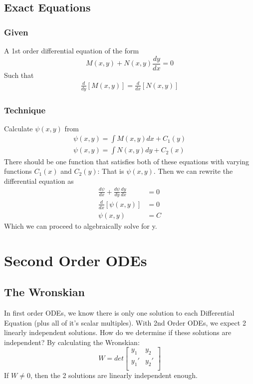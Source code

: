 \documentclass[11pt]{article}
\begin{document}
\subsection{Exact Equations}
\subsubsection{Given}
A 1st order differential equation of the form
    \[ M(x,y) + N(x,y)\frac{dy}{dx} = 0 \]
Such that
\begin{align*}
    \frac{d}{dy}[M(x,y)] = \frac{d}{dx}[ N(x,y)]
\end{align*}
\subsubsection{Technique}
Calculate $\psi (x,y)$ from
\begin{align*}
    \psi (x,y) = \int M(x,y)dx + C_1(y) \\
    \psi (x,y) = \int N(x,y)dy + C_2(x) 
\end{align*}
There should be one function that satisfies both of these equations with varying functions $C_1(x)$ and 
$C_2(y)$: That is $\psi (x,y)$. Then we can rewrite the differential equation as
\begin{align*}
\frac{d\psi}{dx} + \frac{d\psi}{dy}\frac{dy}{dx} &= 0 \\
\frac{d}{dx}[\psi (x,y)] &= 0\\
\psi (x,y) &= C
\end{align*}
Which we can proceed to algebraically solve for y.

\section{Second Order ODEs}
\subsection{The Wronskian}
In first order ODEs, we know there is only one solution to each Differential Equation (plus all of it's
scalar multiples). With 2nd Order ODEs, we expect 2 linearly independent solutions. How do we determine
if these solutions are independent? By calculating the Wronskian:
\[
    W = det\begin{bmatrix}
            y_1  & y_2 \\  
            y_1' & y_2'\\
            \end{bmatrix}
\]
If $ W \neq 0 $, then the 2 solutions are linearly independent enough. 
\end{document}
